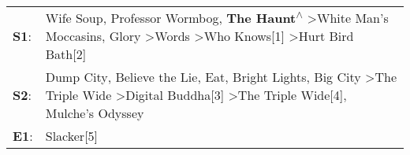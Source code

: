 \begin{supertabular}{p{0.03\textwidth}p{0.92\textwidth}}
 \textbf{S1}:  &  Wife Soup\textsuperscript{}, \enspace Professor Wormbog\textsuperscript{}, \enspace \textbf{The Haunt\textsuperscript{$\wedge$}} \textgreater \enspace White Man's Moccasins\textsuperscript{}, \enspace Glory\textsuperscript{} \textgreater \enspace Words\textsuperscript{} \textgreater \enspace Who Knows[1]\textsuperscript{} \textgreater \enspace Hurt Bird Bath[2]\textsuperscript{}  \enspace  \\
 \textbf{S2}:  &          Dump City\textsuperscript{}, \enspace Believe the Lie\textsuperscript{}, \enspace Eat\textsuperscript{}, \enspace Bright Lights, Big City\textsuperscript{} \textgreater \enspace The Triple Wide\textsuperscript{} \textgreater \enspace Digital Buddha[3]\textsuperscript{} \textgreater \enspace The Triple Wide[4]\textsuperscript{}, \enspace Mulche's Odyssey\textsuperscript{}  \enspace  \\
 \textbf{E1}:  &                                                                                                                                                                                                                                                                                                                                                                   Slacker[5]\textsuperscript{}  \enspace  \\
\end{supertabular}
